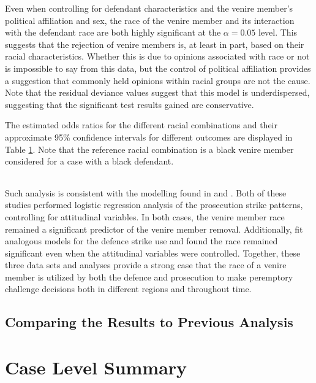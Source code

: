 Even when controlling for defendant characteristics and the venire member's political affiliation and sex, the race of the venire
member and its interaction with the defendant race are both highly significant at the $\alpha = 0.05$ level. This suggests that
the rejection of venire members is, at least in part, based on their racial characteristics. Whether this is due to opinions
associated with race or not is impossible to say from this data, but the control of political affiliation provides a suggestion
that commonly held opinions within racial groups are not the cause. Note that the residual deviance values suggest that this model
is underdispersed, suggesting that the significant test results gained are conservative.

The estimated odds ratios for the different racial combinations and their approximate 95\% confidence intervals for different
outcomes are displayed in Table \ref{tab:fullmodcoef}. Note that the reference racial combination is a black venire member
considered for a case with a black defendant.

\begin{table}[h!]
  \centering
  \label{tab:fullmodcoef}
  \begin{tabular}{|c|c|c|c|c|c|c|} \hline
  \end{tabular}
\end{table}    

Such analysis is consistent with the modelling found in \cite{StubbornLegacy} and \cite{PerempChalMurder}. Both of these studies
performed logistic regression analysis of the prosecution strike patterns, controlling for attitudinal variables. In both cases,
the venire member race remained a significant predictor of the venire member removal. Additionally, \citeauthor{PerempChalMurder}
fit analogous models for the defence strike use and found the race remained significant even when the attitudinal variables were
controlled. Together, these three data sets and analyses provide a strong case that the race of a venire member is utilized by
both the defence and prosecution to make peremptory challenge decisions both in different regions and throughout time.

\subsection{Comparing the Results to Previous Analysis}
                
\section{Case Level Summary} \label{sec:casesum}

